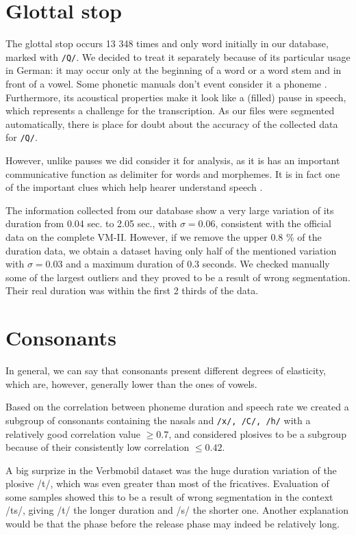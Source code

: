 \documentclass[11pt,a4paper]{scrbook}
\begin{document}
\section{Glottal stop}
The glottal stop occurs 13 348 times and only word initially in our database, marked with \texttt{/Q/}. We decided to treat it separately because of its particular usage in German: it may occur only at the beginning of a word or a word stem and in front of a vowel. Some phonetic manuals don't event consider it a phoneme \cite{Ternes2012}. Furthermore, its acoustical properties make it look like a (filled) pause in speech, which represents a challenge for the transcription. As our files were segmented automatically, there is place for doubt about the accuracy of the collected data for \texttt{/Q/}.

However, unlike pauses we did consider it  for analysis, as it is has an important communicative function as delimiter for words and morphemes. It is in fact one of the important clues which help hearer understand speech \cite{Ternes2012}. 

The information collected from our database show a very large variation of its duration from 0.04 sec. to 2.05 sec., with $\sigma = 0.06$, consistent with the official data on the complete VM-II. However, if we remove the upper 0.8 \% of the duration data, we obtain a dataset having only half of the mentioned variation with $\sigma = 0.03$ and a maximum duration of 0.3 seconds. We checked manually some of the largest outliers and they proved to be a result of wrong segmentation. Their real duration was within the first 2 thirds of the data.

\section{Consonants}
In general, we can say that consonants present different degrees of elasticity, which are, however, generally lower than the ones of vowels.

Based on the correlation between phoneme duration and speech rate we created a subgroup of consonants containing the nasals and \texttt{/x/, /C/, /h/} with a relatively good correlation value $\geq 0.7$, and considered plosives to be a subgroup because of their consistently low correlation $\leq 0.42$.

A big surprize in the Verbmobil dataset was the huge duration variation of the plosive /t/, which was even greater than most of the fricatives. Evaluation of some samples showed this to be a result of wrong segmentation in the context /ts/, giving /t/ the longer duration and /s/ the shorter one. Another explanation would be that the phase before the release phase may indeed be relatively long.
\end{document}
